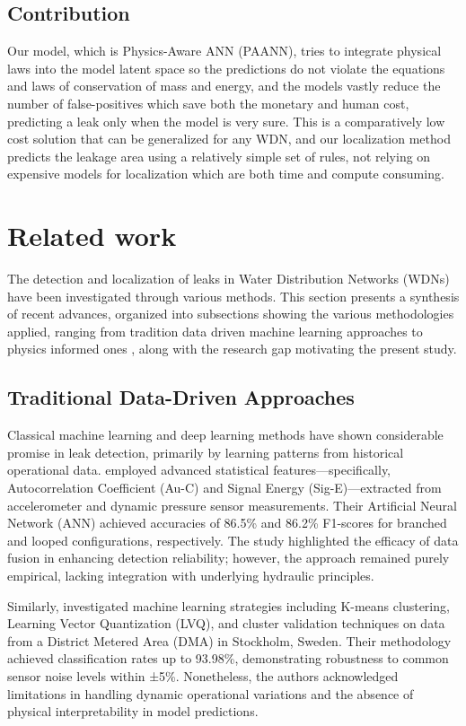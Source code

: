 \documentclass[final,5p,times,twocolumn,authoryear]{elsarticle}
\begin{document}
\subsection{Contribution}
Our model, which is Physics-Aware ANN (PAANN), tries to integrate physical laws into the model latent space so the predictions do not violate the equations and laws of conservation of mass and energy, and the models vastly reduce the number of false-positives which save both the monetary and human cost, predicting a leak only when the model is very sure. This is a comparatively low cost solution that can be generalized for any WDN, and our localization method predicts the leakage area using a relatively simple set of rules, not relying on expensive models for localization which are both time and compute consuming.

\section{Related work}

The detection and localization of leaks in Water Distribution Networks (WDNs) have been
 investigated through various methods. This section presents a synthesis of recent advances, organized into subsections showing the various methodologies applied, ranging from tradition data driven machine learning approaches to physics informed ones , along with the research gap motivating the present study.

\subsection{Traditional Data-Driven Approaches}

Classical machine learning and deep learning methods have shown considerable promise in leak detection, primarily by learning patterns from historical operational data. \cite{MAHDI2024100685} employed advanced statistical features—specifically, Autocorrelation Coefficient (Au-C) and Signal Energy (Sig-E)—extracted from accelerometer and dynamic pressure sensor measurements. Their Artificial Neural Network (ANN) achieved accuracies of 86.5\% and 86.2\% F1-scores for branched and looped configurations, respectively. The study highlighted the efficacy of data fusion in enhancing detection reliability; however, the approach remained purely empirical, lacking integration with underlying hydraulic principles.

Similarly, \cite{sousa2023leakagedetection} investigated machine learning strategies including K-means clustering, Learning Vector Quantization (LVQ), and cluster validation techniques on data from a District Metered Area (DMA) in Stockholm, Sweden. Their methodology achieved classification rates up to 93.98\%, demonstrating robustness to common sensor noise levels within ±5\%. Nonetheless, the authors acknowledged limitations in handling dynamic operational variations and the absence of physical interpretability in model predictions.
\end{document}

